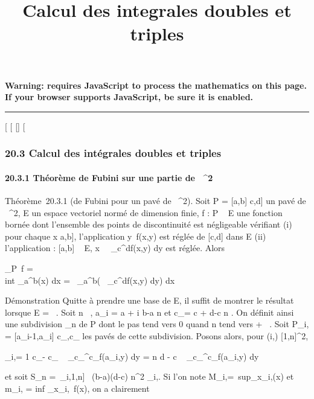 \documentclass[]{article}
\title{Calcul des integrales doubles et triples}
\author{}
\date{}
\begin{document}
\maketitle

\textbf{Warning: 
requires JavaScript to process the mathematics on this page.\\ If your
browser supports JavaScript, be sure it is enabled.}

\begin{center}\rule{3in}{0.4pt}\end{center}

{[}
{[}
{[}{]}
{[}

\subsubsection{20.3 Calcul des intégrales doubles et triples}

\paragraph{20.3.1 Théorème de Fubini sur une partie de ~^2}

Théorème~20.3.1 (de Fubini pour un pavé de ~^2). Soit P =
{[}a,b{]} \times {[}c,d{]} un pavé de ~^2, E un espace vectoriel
normé de dimension finie, f : P \rightarrow~ E une fonction bornée dont l'ensemble
des points de discontinuité est négligeable vérifiant (i) pour chaque x
\in {[}a,b{]}, l'application y\mapsto~f(x,y) est
réglée de {[}c,d{]} dans E (ii) l'application \phi : {[}a,b{]} \rightarrow~ E,
x\mapsto~\int ~
\_c^df(x,y) dy est réglée. Alors

\int  \_P~f =\\int
 \_a^b\phi(x) dx =\int ~
\_a^b\left (\int ~
\_c^df(x,y) dy\right ) dx

Démonstration Quitte à prendre une base de E, il suffit de montrer le
résultat lorsque E = ~. Soit n \in {}~, a\_i = a + i b-a
\over n et c\_\jmath = c + \jmath d-c
\over n . On définit ainsi une subdivision \sigma\_n
de P dont le pas tend vers 0 quand n tend vers + \infty~. Soit P\_i,\jmath
= {[}a\_i-1,a\_i{]} \times {[}c\_,c\_\jmath{]}
les pavés de cette subdivision. Posons alors, pour (i,\jmath) \in
{[}1,n{]}^2,

\mu\_i,\jmath = 1 \over c\_\jmath -
c\_ \int ~
\_c\_^c\_\jmath f(a\_i,y) dy = n
\over d - c \int ~
\_c\_^c\_\jmath f(a\_i,y) dy

et soit S\_n =\
\sum  \_i,\jmath\in{[}1,n{]}~ (b-a)(d-c)
\over n^2 \mu\_i,\jmath. Si l'on note
M\_i,\jmath =\
sup\_x\inP\_i,\jmathf(x) et m\_i,\jmath
= inf \_x\inP\_i,\jmath~f(x), on a
clairement
\end{document}
